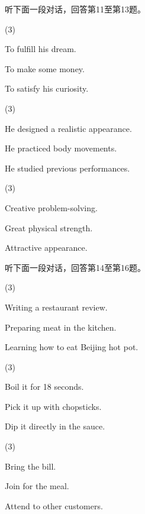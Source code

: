 \documentclass{英语试卷}
\begin{document}
\par 听下面一段对话，回答第11至第13题。\par
{}
\begin{choices}(3)
  \item To fulfill his dream.
  \item To make some money.
  \item To satisfy his curiosity.
\end{choices}
\begin{choices}(3)
  \item He designed a realistic appearance.
  \item He practiced body movements.
  \item He studied previous performances.
\end{choices}
\begin{choices}(3)
  \item Creative problem-solving.
  \item Great physical strength.
  \item Attractive appearance.
\end{choices}
\par 听下面一段对话，回答第14至第16题。\par
{}
\begin{choices}(3)
  \item Writing a restaurant review.
  \item Preparing meat in the kitchen.
  \item Learning how to eat Beijing hot pot.
\end{choices}
\begin{choices}(3)
  \item Boil it for 18 seconds.
  \item Pick it up with chopsticks.
  \item Dip it directly in the sauce.
\end{choices}
\begin{choices}(3)
  \item Bring the bill.
  \item Join for the meal.
  \item Attend to other customers.
\end{choices}
\end{document}
